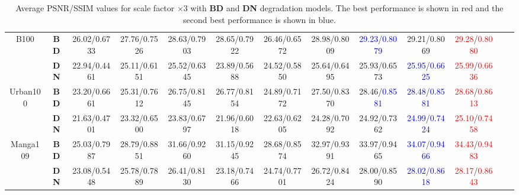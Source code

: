 \documentclass[10pt,twocolumn,letterpaper]{article}
\begin{document}
\begin{table*}[!htbp]
{\begin{tabular}{|c|c|c|c|c|c|c|c|c|c|c|c|c|}
			\hline\hline
			\multirow{2}{*}{B100}     & \textbf{BD}            & 26.02/0.6733             & 27.76/0.7526 & 28.63/0.7903 & 28.65/0.7922 & 26.46/0.6572 & 28.98/0.8009 & \textcolor{blue}{29.23}/\textcolor{blue}{0.8079 } & 29.21/0.8069                                     & \textcolor{red}{29.28}/\textcolor{red}{0.8080}  \\
			& \textbf{DN}            & 22.94/0.4461             & 25.11/0.6151 & 25.52/0.6345 & 23.89/0.5688 & 24.52/0.5850 & 25.64/0.6495 & 25.93/0.6573                                      & \textcolor{blue}{25.95}/\textcolor{blue}{0.6625} & \textcolor{red}{25.99}/\textcolor{red}{0.6636}  \\ 
			\hline\hline
			\multirow{2}{*}{Urban100} & \textbf{BD}            & 23.20/0.6661             & 25.31/0.7612 & 26.75/0.8145 & 26.77/0.8154 & 24.89/0.7172 & 27.50/0.8370 & 28.46/\textcolor{blue}{0.8581}                    & \textcolor{blue}{28.48}/\textcolor{blue}{0.8581} & \textcolor{red}{28.68}/\textcolor{red}{0.8613}  \\
			& \textbf{DN}            & 21.63/0.4701             & 23.32/0.6500 & 23.83/0.6797 & 21.96/0.6018 & 22.63/0.6205 & 24.28/0.7092 & 24.92/0.7362                                      & \textcolor{blue}{24.99}/\textcolor{blue}{0.7424} & \textcolor{red}{25.10}/\textcolor{red}{0.7458}  \\ 
			\hline\hline
			\multirow{2}{*}{Manga109} & \textbf{BD}            & 25.03/0.7987             & 28.79/0.8851 & 31.66/0.9260 & 31.15/0.9245 & 28.68/0.8574 & 32.97/0.9391 & 33.97/0.9465                                      & \textcolor{blue}{34.07}/\textcolor{blue}{0.9466} & \textcolor{red}{34.43}/\textcolor{red}{0.9483}  \\
			& \textbf{DN}            & 23.08/0.5448             & 25.78/0.7889 & 26.41/0.8130 & 23.18/0.7466 & 24.74/0.7701 & 26.72/0.8424 & 28.00/0.8590                                      & \textcolor{blue}{28.02}/\textcolor{blue}{0.8618} & \textcolor{red}{28.17}/\textcolor{red}{0.8643}  \\
			\hline
			
	\end{tabular}}
	\smallskip
	\caption{Average PSNR/SSIM values for scale factor $\times3$ with \textbf{BD} and \textbf{DN} degradation models. The best performance is shown in {\color{red}red} and the second best performance is shown in {\color{blue}blue}.\label{comp_sot_md}}
	
	\end{table*}
\end{document}
